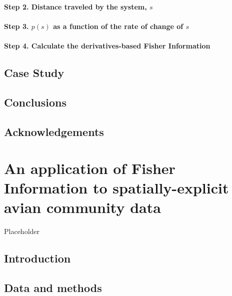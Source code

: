 \documentclass[12pt,twoside,openany]{reedthesis}
\begin{document}
\subsubsection{\texorpdfstring{\textbf{Step 2.} Distance traveled by the
system,
\(s\)}{Step 2. Distance traveled by the system, s}}\label{step-2.-distance-traveled-by-the-system-s}

\subsubsection{\texorpdfstring{\textbf{Step 3.} \(p(s)\) as a function
of the rate of change of
\(s\)}{Step 3. p(s) as a function of the rate of change of s}}\label{step-3.-ps-as-a-function-of-the-rate-of-change-of-s}

\subsubsection{\texorpdfstring{\textbf{Step 4.} Calculate the
derivatives-based Fisher
Information}{Step 4. Calculate the derivatives-based Fisher Information}}\label{step-4.-calculate-the-derivatives-based-fisher-information}

\section{Case Study}\label{case-study}

\section{Conclusions}\label{conclusions}

\section{Acknowledgements}\label{acknowledgements}

\chapter{An application of Fisher Information to spatially-explicit
avian community data}\label{fisherSpatial}

Placeholder

\section{Introduction}\label{introduction-2}

\section{Data and methods}\label{data-and-methods}
\end{document}
